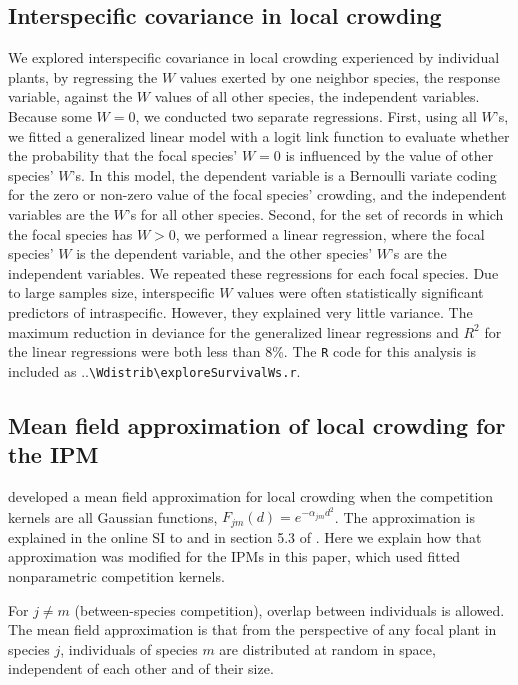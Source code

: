 \documentclass[11pt]{article}
\begin{document}
\subsection{Interspecific covariance in local crowding} 
We explored interspecific covariance in local crowding experienced by individual plants, by regressing the $W$ values exerted by one neighbor species, the response variable, against the $W$ values of all other species, the independent variables. Because some $W=0$, we conducted two separate regressions. First, using all $W$'s, we fitted a generalized linear model with a logit link function to evaluate whether the probability that the focal species' $W=0$ is influenced by the value of other species' $W$'s. In this model, the dependent variable is a Bernoulli variate coding for the zero or non-zero value of the focal species' crowding, and the independent variables are the $W$'s for all other species. Second, for the set of records in which the focal species has $W>0$, we performed a linear regression, where the focal species' $W$ is the dependent variable, and the other species' $W$'s are the independent variables. We repeated these regressions for each focal species. Due to large samples size, interspecific $W$ values were often statistically significant predictors of intraspecific. However, they explained very little variance. The maximum reduction in deviance for the generalized linear regressions and $R^2$ for the linear regressions were both less than 8\%. The \texttt{R} code for this analysis is included as ..\texttt{\textbackslash Wdistrib\textbackslash exploreSurvivalWs.r}.

\subsection{Mean field approximation of local crowding for the IPM} 
\citet{adler_coexistence_2010} developed a mean field approximation for local crowding when the
competition kernels are all Gaussian functions, $F_{jm}(d) = e^{-\alpha_{jm} d^2}$. The approximation is explained in 
the online SI to \citet{adler_coexistence_2010} and in section 5.3 of \citet{Ellner2016}. 
Here we explain how that approximation was modified for the IPMs in this paper, which
used fitted nonparametric competition kernels. 

For $j \ne m$ (between-species competition), overlap between individuals is allowed. The mean field approximation is 
that from the perspective of any focal plant in species $j$, individuals of species $m$ are distributed at random in space, 
independent of each other and of their size.
\end{document}
